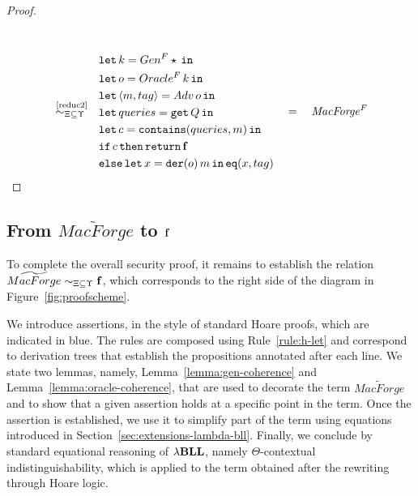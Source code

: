 \begin{proof}
{\begin{align*}
\begin{aligned}
    \end{aligned}
    \\[2ex]
    \quad\overset{\text{~\ref{reduc2}}}{\sim_{\Xi\subseteq\Upsilon}}\quad&
    \begin{aligned}
        &\mathtt{let}\,k=Gen^F \star\,\mathtt{in}\, \\
        &\mathtt{let}\,o=Oracle^F\,k\,\mathtt{in}\, \\
        &\mathtt{let}\,\langle m,tag \rangle = Adv\, o\,\mathtt{in}\, \\
        &\mathtt{let}\,queries = \mathtt{get}\, Q\,\mathtt{in}\, \\
        &\mathtt{let}\,c=\mathtt{contains}(queries, m)\,\mathtt{in}\, \\
        &\mathtt{if}\, c\, \mathtt{then}\, \mathtt{return}\, \mathbf{f} \\
        &\mathtt{else}\,\mathtt{let}\,x=\mathtt{der}(o)\, m\,\mathtt{in}\, \mathtt{eq}(x,tag)
    \end{aligned}
    \quad=\quad\mathit{MacForge^F}
\end{align*}
}
\end{proof}

\subsection{From \texorpdfstring{$\widetilde{MacForge}$}{MacForge} to \texorpdfstring{$\mathbf{f}$}{false}}

To complete the overall security proof, it remains to establish the relation $\widetilde{MacForge}\sim_{\Xi\subseteq\Upsilon} \mathbf{f}$, which corresponds to the right side of the diagram in Figure~\ref{fig:proofscheme}.

We introduce assertions, in the style of standard Hoare proofs, which are indicated in blue. The rules are composed using Rule~\ref{rule:h-let} and correspond to derivation trees that establish the propositions annotated after each line. We state two lemmas, namely, Lemma~\ref{lemma:gen-coherence} and Lemma~\ref{lemma:oracle-coherence}, that are used to decorate the term $\widetilde{MacForge}$ and to show that a given assertion holds at a specific point in the term. Once the assertion is established, we use it to simplify part of the term using equations introduced in Section~\ref{sec:extensions-lambda-bll}. Finally, we conclude by standard equational reasoning of ${\lambda}\mathbf{BLL}$, namely $\Theta$-contextual indistinguishability, which is applied to the term obtained after the rewriting through Hoare logic.

